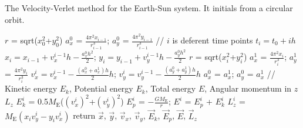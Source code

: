 \begin{algorithm}[tb]
	\caption{The Velocity-Verlet method for the Earth-Sun system. It initials from a circular orbit.}
	\label{alg::verlet}
	$r$ = sqrt($x_0^2$+$y_0^2$)\;
	$a_x^0$ = $\frac{4\pi^2x_{i-1}}{r_{i-1}^3}$;
    $a_y^0$ = $\frac{4\pi^2y_{i-1}}{r_{i-1}^3}$\;
	// $i$ is deferent time points $t_i=t_0+ih$\;
    {$x_{i} = x_{i-1} + v_x^{i-1}h - \frac{a_x^0h^2}{2}$;
    $y_{i} = y_{i-1} + v_y^{i-1}h - \frac{a_y^0h^2}{2}$\;
    $r$ = sqrt($x_i^2$+$y_i^2$)\;
    $a_x^1$ = $\frac{4\pi^2x_{i}}{r_{i}^3}$;
    $a_y^1$ = $\frac{4\pi^2y_{i}}{r_{i}^3}$\;
    $v_x^{i} = v_x^{i-1} - \frac{(a_x^0+a_x^1)h}{2}h$;
    $v_y^{i} = v_y^{i-1} - \frac{(a_y^0+a_y^1)h}{2}h$\;
	$a_x^0$ = $a_x^1$;
    $a_y^0$ = $a_x^1$\;
    // Kinetic energy $E_k$, Potential energy $E_k$, Total energy $E$, Angular momentum in $\hat{z}$ $L_z$\;
    $E_k^i$ = 0.5$M_{\mathrm{E}}$($(v_x^{i})^2$+$(v_y^{i})^2$)\;
    $E_p^i$ = $-\frac{GM_{\mathrm{E}}}{r}$;
    $E^i$ = $E_p^i$ + $E_k^i$\;
    $L_z^i$ = $M_{\mathrm{E}}(x_iv_y^{i}-y_iv_x^{i})$\;
    }
	return $\vec{x}$, $\vec{y}$, $\vec{v}_x$, $\vec{v}_y$, $\vec{E}_k$, $\vec{E}_p$, $\vec{E}$, $\vec{L}_z$\;
\end{algorithm}
